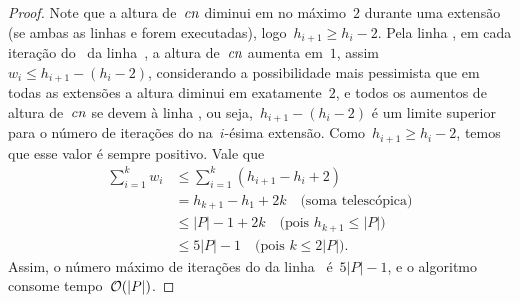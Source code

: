 \begin{proof}
Note que a altura de~$\mathit{cn}$ diminui em no máximo~$2$ durante uma extensão (se ambas as linhas  e  forem executadas), logo~$h_{i+1} \geq h_i - 2$. Pela linha , em cada iteração do~ da linha~, a altura de~$\mathit{cn}$ aumenta em~$1$, assim~$w_i \leq h_{i+1} - (h_i - 2)$, considerando a possibilidade mais pessimista que em todas as extensões a altura diminui em exatamente~$2$, e todos os aumentos de altura de~$\mathit{cn}$ se devem à linha , ou seja,~${h_{i+1} - (h_i - 2)}$ é um limite superior para o número de iterações do  na~$i$-ésima extensão. Como~$h_{i+1} \geq h_i - 2$, temos que esse valor é sempre positivo. Vale que
\begin{equation*} \begin{split}
\sum\limits_{i=1}^k{w_i} & \leq \sum\limits_{i=1}^k{(h_{i+1} - h_i + 2)} \\
                         & = h_{k+1} - h_1 + 2k \quad\text{(soma telescópica)}\\
                         & \leq |P| - 1 + 2k \quad\text{(pois~$h_{k+1} \leq |P|$)}\\
                         & \leq 5|P| - 1 \quad\text{(pois~$k \leq 2|P|$).}
\end{split}
\end{equation*}
Assim, o número máximo de iterações do  da linha~ é~$5|P|-1$, e o algoritmo consome tempo~$\mathcal{O}(|P|)$.

\end{proof} 